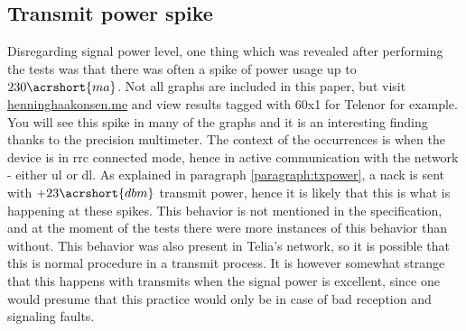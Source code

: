 \documentclass[USenglish]{ifimaster}  %
\begin{document}
\subsection{Transmit power spike}
Disregarding signal power level, one thing which was revealed after performing the tests was that there was often a spike of power usage up to ${230 \acrshort{ma}}$. Not all graphs are included in this paper, but visit \url{henninghaakonsen.me} and view results tagged with 60x1 for Telenor for example. You will see this spike in many of the graphs and it is an interesting finding thanks to the precision multimeter. The context of the occurrences is when the device is in \acrshort{rrc} connected mode, hence in active communication with the network - either \acrshort{ul} or \acrshort{dl}. As explained in paragraph \vref{paragraph:txpower}, a \acrshort{nack} is sent with ${+23 \acrshort{dbm}}$ transmit power, hence it is likely that this is what is happening at these spikes. This behavior is not mentioned in the specification, and at the moment of the tests there were more instances of this behavior than without. This behavior was also present in Telia's network, so it is possible that this is normal procedure in a transmit process. It is however somewhat strange that this happens with transmits when the signal power is excellent, since one would presume that this practice would only be in case of bad reception and signaling faults.
\end{document}
